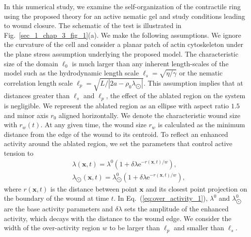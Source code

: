 In this numerical study, we examine the self-organization of the contractile ring using the proposed theory for an active nematic gel and study conditions leading to wound closure. The schematic of the test is illustrated in Fig.~\ref{sec_1_chap_3_fig_1}(a). We make the following assumptions. We ignore the curvature of the cell and consider a  planar patch of actin cytoskeleton under the plane stress assumption underlying the proposed model. The characteristic size of the domain $ \ell_0$ is much larger than any inherent length-scales of the model such as the hydrodynamic length scale $\ell_s=\sqrt{\eta/\gamma}$ or the nematic correlation length scale $\ell_p=\sqrt{L/|2a-\rho_0\lambda_{\bigodot}|}$. This assumption implies that at distances greater than $\ell_s$ and $\ell_p$, the effect of the ablated region on the system is negligible. We represent the ablated region as an ellipse with aspect ratio $1.5$ and  minor axis $r_0$ aligned horizontally. We denote the characteristic wound size with $r_w(t)$. At any given time, the wound size $r_w$ is calculated as the minimum distance from the edge of the wound to its centroid. To reflect an enhanced activity around the ablated region, we set the parameters that control active tension to
\begin{align} \label{eq:over_activity_1}
	& 	\lambda(\bm{x},t)=  \lambda^{0} \left( 1+  \delta \lambda\text{e}^{-r(\bm{x},t)/w}  \right), \\ & 
	\lambda_{\bigodot}(\bm{x},t)=  \lambda^{0}_{\bigodot} \left( 1+   \delta \lambda\text{e}^{-r(\bm{x},t)/w}  \right), \nonumber
\end{align}
where $r(\bm{x},t)$ is the distance between point $\bm{x}$ and its closest point projection on the boundary of the wound at time $t$.  In Eq.~(\ref{eq:over_activity_1}), $\lambda^0$ and  $\lambda_{\bigodot}^0$ are the base activity parameters and  $\delta \lambda$ sets the amplitude of the enhanced activity, which decays with the distance to the wound edge. We consider the width of the over-activity region $w$ to be larger than $\ell_p$ and smaller than $\ell_s$. 


